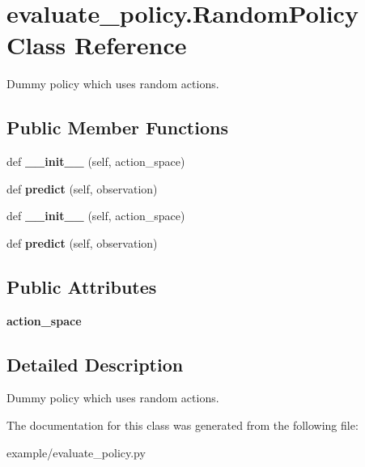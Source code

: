 \hypertarget{classevaluate__policy_1_1RandomPolicy}{}\section{evaluate\+\_\+policy.\+Random\+Policy Class Reference}
\label{classevaluate__policy_1_1RandomPolicy}


Dummy policy which uses random actions.  


\subsection*{Public Member Functions}
\begin{DoxyCompactItemize}
\item 
\mbox{\label{classevaluate__policy_1_1RandomPolicy_ab17a5904a79a5ff6a9606ce9171af7ee}} 
def {\bfseries \+\_\+\+\_\+init\+\_\+\+\_\+} (self, action\+\_\+space)
\item 
\mbox{\label{classevaluate__policy_1_1RandomPolicy_ae1e2478222b2e6b00a68b7973a60ebe1}} 
def {\bfseries predict} (self, observation)
\item 
\mbox{\label{classevaluate__policy_1_1RandomPolicy_ab17a5904a79a5ff6a9606ce9171af7ee}} 
def {\bfseries \+\_\+\+\_\+init\+\_\+\+\_\+} (self, action\+\_\+space)
\item 
\mbox{\label{classevaluate__policy_1_1RandomPolicy_ae1e2478222b2e6b00a68b7973a60ebe1}} 
def {\bfseries predict} (self, observation)
\end{DoxyCompactItemize}
\subsection*{Public Attributes}
\begin{DoxyCompactItemize}
\item 
\mbox{\label{classevaluate__policy_1_1RandomPolicy_adfcfaa59da2ab4aed58a1cd95f99b7d8}} 
{\bfseries action\+\_\+space}
\end{DoxyCompactItemize}


\subsection{Detailed Description}
Dummy policy which uses random actions. 



The documentation for this class was generated from the following file\+:\begin{DoxyCompactItemize}
\item 
example/evaluate\+\_\+policy.\+py\end{DoxyCompactItemize}
